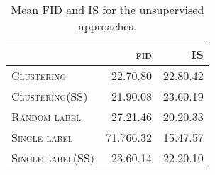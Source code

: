 \documentclass{article}
\newcommand{\tranC}{\textsc{Clustering}}
\newcommand{\slabels}{\textsc{Single label}}
\newcommand{\rlabels}{\textsc{Random label}}
\begin{document}
\begin{table}[h]
\centering
\caption{Mean FID and IS for the unsupervised approaches.\vspace{0.2cm}}
\label{tab:unsupervised_fid_is_mean_std}
\setlength\tabcolsep{4.5pt}
\begin{tabular}{lrr}
\toprule
{} & \textsc{fid} & \textsc{IS} \\\midrule
\tranC     &   22.70.80 &  22.80.42 \\
\tranC (SS) &   21.90.08 &  23.60.19 \\
\rlabels          &   27.21.46 &  20.20.33 \\
\slabels          &  71.766.32 &  15.47.57 \\
\slabels (SS)     &   23.60.14 &  22.20.10 \\
\bottomrule
\end{tabular} \end{table}
\end{document}
